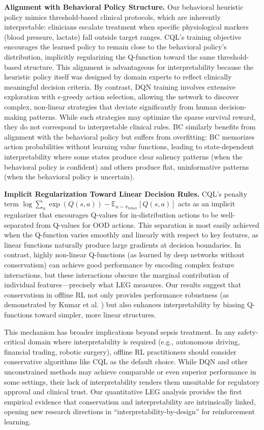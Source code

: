 \textbf{Alignment with Behavioral Policy Structure.} Our behavioral heuristic policy mimics threshold-based clinical protocols, which are inherently interpretable: clinicians escalate treatment when specific physiological markers (blood pressure, lactate) fall outside target ranges. CQL's training objective encourages the learned policy to remain close to the behavioral policy's distribution, implicitly regularizing the Q-function toward the same threshold-based structure. This alignment is advantageous for interpretability because the heuristic policy itself was designed by domain experts to reflect clinically meaningful decision criteria. By contrast, DQN training involves extensive exploration with $\epsilon$-greedy action selection, allowing the network to discover complex, non-linear strategies that deviate significantly from human decision-making patterns. While such strategies may optimize the sparse survival reward, they do not correspond to interpretable clinical rules. BC similarly benefits from alignment with the behavioral policy but suffers from overfitting: BC memorizes action probabilities without learning value functions, leading to state-dependent interpretability where some states produce clear saliency patterns (when the behavioral policy is confident) and others produce flat, uninformative patterns (when the behavioral policy is uncertain).

\textbf{Implicit Regularization Toward Linear Decision Rules.} CQL's penalty term $\log \sum_a \exp(Q(s, a)) - \mathbb{E}_{a \sim \pi_{\text{behav}}} [Q(s, a)]$ acts as an implicit regularizer that encourages Q-values for in-distribution actions to be well-separated from Q-values for OOD actions. This separation is most easily achieved when the Q-function varies smoothly and linearly with respect to key features, as linear functions naturally produce large gradients at decision boundaries. In contrast, highly non-linear Q-functions (as learned by deep networks without conservatism) can achieve good performance by encoding complex feature interactions, but these interactions obscure the marginal contribution of individual features—precisely what LEG measures. Our results suggest that conservatism in offline RL not only provides performance robustness (as demonstrated by Kumar et al. \citeyearpar{kumar2020cql}) but also enhances interpretability by biasing Q-functions toward simpler, more linear structures.

This mechanism has broader implications beyond sepsis treatment. In any safety-critical domain where interpretability is required (e.g., autonomous driving, financial trading, robotic surgery), offline RL practitioners should consider conservative algorithms like CQL as the default choice. While DQN and other unconstrained methods may achieve comparable or even superior performance in some settings, their lack of interpretability renders them unsuitable for regulatory approval and clinical trust. Our quantitative LEG analysis provides the first empirical evidence that conservatism and interpretability are intrinsically linked, opening new research directions in ``interpretability-by-design'' for reinforcement learning.


